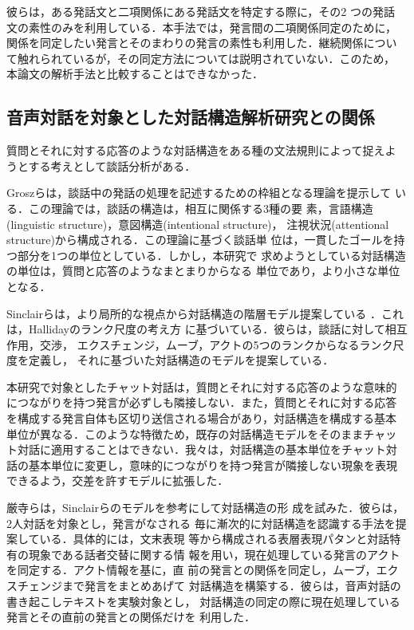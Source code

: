 彼らは，ある発話文と二項関係にある発話文を特定する際に，その2 つの発話
文の素性のみを利用している．本手法では，発言間の二項関係同定のために，
関係を同定したい発言とそのまわりの発言の素性も利用した．継続関係につい
て触れられているが，その同定方法については説明されていない．このため，
本論文の解析手法と比較することはできなかった． 

\subsection{音声対話を対象とした対話構造解析研究との関係}
質問とそれに対する応答のような対話構造をある種の文法規則によって捉えよ
うとする考えとして談話分析がある．

Groszらは，談話中の発話の処理を記述するための枠組となる理論を提示して
いる\cite{Grosz:86}．この理論では，談話の構造は，相互に関係する3種の要
素，言語構造(linguistic structure)，意図構造(intentional structure)，
注視状況(attentional structure)から構成される．この理論に基づく談話単
位は，一貫したゴールを持つ部分を1つの単位としている．しかし，本研究で
求めようとしている対話構造の単位は，質問と応答のようなまとまりからなる
単位であり，より小さな単位となる．

Sinclairらは，より局所的な視点から対話構造の階層モデル提案している
\cite{Sinclair:92}．これは，Hallidayのランク尺度の考え方
\cite{Halliday:61}に基づいている．彼らは，談話に対して相互作用，交渉，
エクスチェンジ，ムーブ，アクトの5つのランクからなるランク尺度を定義し，
それに基づいた対話構造のモデルを提案している．

本研究で対象としたチャット対話は，質問とそれに対する応答のような意味的
につながりを持つ発言が必ずしも隣接しない．また，質問とそれに対する応答
を構成する発言自体も区切り送信される場合があり，対話構造を構成する基本
単位が異なる．このような特徴ため，既存の対話構造モデルをそのままチャッ
ト対話に適用することはできない．我々は，対話構造の基本単位をチャット対
話の基本単位に変更し，意味的につながりを持つ発言が隣接しない現象を表現
できるよう，交差を許すモデルに拡張した．

厳寺らは，Sinclairらのモデル\cite{Sinclair:92}を参考にして対話構造の形
成を試みた\cite{Iwadera:98}．彼らは，2人対話を対象とし，発言がなされる
毎に漸次的に対話構造を認識する手法を提案している．具体的には，文末表現
等から構成される表層表現パタンと対話特有の現象である話者交替に関する情
報を用い，現在処理している発言のアクトを同定する．アクト情報を基に，直
前の発言との関係を同定し，ムーブ，エクスチェンジまで発言をまとめあげて
対話構造を構築する．彼らは，音声対話の書き起こしテキストを実験対象とし，
対話構造の同定の際に現在処理している発言とその直前の発言との関係だけを
利用した．

